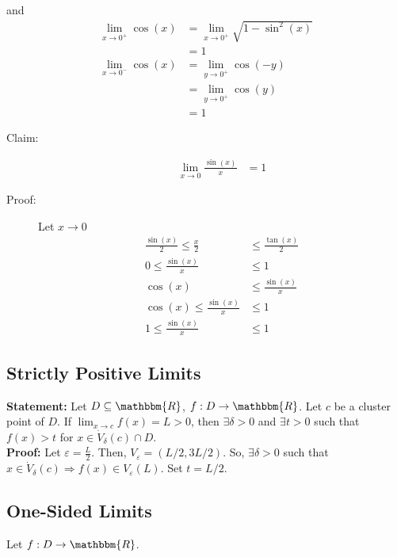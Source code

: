 \documentclass[10pt]{extarticle}
\newcommand{\R}{\mathbbm{R}}
\begin{document}
    and
    \begin{align*}
      \lim_{x\rightarrow 0^+} \cos(x) &= \lim_{x\rightarrow 0^{+}} \sqrt{1-\sin^2(x)}\\
                                      &= 1\\
      \lim_{x\rightarrow 0^{-}} \cos(x) &= \lim_{y\rightarrow 0^{+}} \cos(-y)\\
                                        &= \lim_{y\rightarrow 0^{+}}\cos(y)\\
                                        &= 1
    \end{align*}
    \begin{description}
      \item[Claim:] 
        \begin{align*}
          \lim_{x\rightarrow 0}\frac{\sin(x)}{x} &= 1
        \end{align*}
      \item[Proof:] Let $x\rightarrow 0$
        \begin{align*}
          \frac{\sin(x)}{2} \leq \frac{x}{2} &\leq \frac{\tan(x)}{2}\\
          0 \leq \frac{\sin(x)}{x} &\leq 1\\
          \cos(x) &\leq \frac{\sin(x)}{x}\\
          \cos(x) \leq \frac{\sin(x)}{x} &\leq 1\\
          1 \leq \frac{\sin(x)}{x} &\leq 1
        \end{align*}
    \end{description}
  \subsection{Strictly Positive Limits}%
    \textbf{Statement:} Let $D\subseteq \R$, $f:D\rightarrow \R$. Let $c$ be a cluster point of $D$. If $\lim_{x\rightarrow c}f(x) = L > 0$, then $\exists \delta > 0$ and $\exists t > 0$ such that $f(x) > t$ for $x\in \dot{V}_{\delta}(c) \cap D$.\\

    \textbf{Proof:} Let $\varepsilon = \frac{L}{2}$. Then, $V_{\varepsilon} = (L/2,3L/2)$. So, $\exists \delta > 0$ such that $x\in \dot{V}_{\delta}(c) \Rightarrow f(x) \in V_{\varepsilon}(L)$. Set $t = L/2$.
  \subsection{One-Sided Limits}%
    Let $f: D\rightarrow \R$.\\
    
\end{document}
